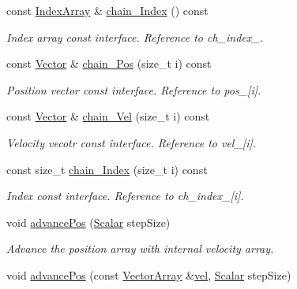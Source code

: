 \begin{DoxyCompactItemize}
const \mbox{\hyperlink{class_space_h_1_1_vel_indep_chain_particles_a48b9183f8d68fe8af42bf405125d450c}{Index\+Array}} \& \mbox{\hyperlink{class_space_h_1_1_vel_indep_chain_particles_a4136b399758a4547ce22024318d9b654}{chain_\+Index}} () const
\begin{DoxyCompactList}\small\item\em Index array const interface. Reference to ch\+\_\+index\+\_\+. \end{DoxyCompactList}\item 
const \mbox{\hyperlink{class_space_h_1_1_vel_indep_particles_a61bbcfdb0dc7f99f3c68af69a755c935}{Vector}} \& \mbox{\hyperlink{class_space_h_1_1_vel_indep_chain_particles_a1d1f6b6ed5e916f84e6502d98773ed13}{chain_\+Pos}} (size\+\_\+t i) const
\begin{DoxyCompactList}\small\item\em Position vector const interface. Reference to pos\+\_\+\mbox{[}i\mbox{]}. \end{DoxyCompactList}\item 
const \mbox{\hyperlink{class_space_h_1_1_vel_indep_particles_a61bbcfdb0dc7f99f3c68af69a755c935}{Vector}} \& \mbox{\hyperlink{class_space_h_1_1_vel_indep_chain_particles_a05d9529a4ee452b4c15efe92584a6d25}{chain_\+Vel}} (size\+\_\+t i) const
\begin{DoxyCompactList}\small\item\em Velocity vecotr const interface. Reference to vel\+\_\+\mbox{[}i\mbox{]}. \end{DoxyCompactList}\item 
const size\+\_\+t \mbox{\hyperlink{class_space_h_1_1_vel_indep_chain_particles_a99486efb9a38d5b097bcb35d46204dfd}{chain_\+Index}} (size\+\_\+t i) const
\begin{DoxyCompactList}\small\item\em Index const interface. Reference to ch\+\_\+index\+\_\+\mbox{[}i\mbox{]}. \end{DoxyCompactList}\item 
void \mbox{\hyperlink{class_space_h_1_1_vel_indep_chain_particles_a647d4861878b28d79b6aab00de12ab8d}{advance\+Pos}} (\mbox{\hyperlink{class_space_h_1_1_vel_indep_particles_aeb47d8131b30ed790320ff634f0d6af1}{Scalar}} step\+Size)
\begin{DoxyCompactList}\small\item\em Advance the position array with internal velocity array. \end{DoxyCompactList}\item 
void \mbox{\hyperlink{class_space_h_1_1_vel_indep_chain_particles_ae71e70b6374f8326b5ffb62d06284942}{advance\+Pos}} (const \mbox{\hyperlink{class_space_h_1_1_vel_indep_particles_aa9983058940249df8b00fa800e8cbad2}{Vector\+Array}} \&\mbox{\hyperlink{class_space_h_1_1_vel_indep_chain_particles_aadbc08f6cf8da3e46eb8d6c619e30c2f}{vel}}, \mbox{\hyperlink{class_space_h_1_1_vel_indep_particles_aeb47d8131b30ed790320ff634f0d6af1}{Scalar}} step\+Size)

\end{DoxyCompactItemize}
